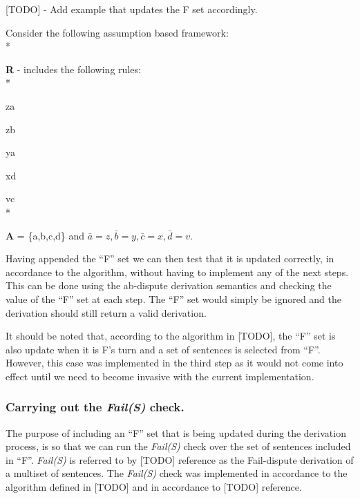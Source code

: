 [TODO] - Add example that updates the F set accordingly.
\begin{framed}
\begin{exmp} Consider the following assumption based framework:
\\*

\noindent\textbf{R} - includes the following rules:
\\*

\indent	z\textleftarrow a

\indent z\textleftarrow b

\indent y\textleftarrow a

\indent x\textleftarrow d

\indent v\textleftarrow c
\\*

\noindent\textbf{A} = \{a,b,c,d\} and $\bar{a} = z, \bar{b} = y, \bar{c} = x, \bar{d} = v$.

\end{exmp}
\end{framed}



Having appended the ``F'' set we can then test that it is updated correctly, in accordance to the algorithm, without having to implement any of the next steps. This can be done using the ab-dispute derivation semantics and checking the value of the ``F'' set at each step. The ``F'' set would simply be ignored and the derivation should still return a valid derivation.

It should be noted that, according to the algorithm in [TODO], the ``F'' set is also update when it is F's turn and a set of sentences is selected from ``F''. However, this case was implemented in the third step as it would not come into effect until we need to become invasive with the current implementation.

\subsubsection{Carrying out the \emph{Fail(S)} check.}

The purpose of including an ``F'' set that is being updated during the derivation process, is so that we can run the \emph{Fail(S)} check over the set of sentences included in ``F''. \emph{Fail(S)} is referred to by [TODO] reference as the Fail-dispute derivation of a multiset of sentences. The \emph{Fail(S)} check was implemented in accordance to the algorithm defined in [TODO] and in accordance to [TODO] reference.

